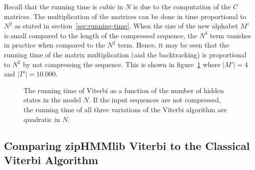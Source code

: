 Recall that the running time is cubic in $N$ is due to the computation of the
$C$ matrices. The multiplication of the matrices can be done in time
proportional to $N^2$ as stated in section~\ref{sec:running-time}. When the
size of the new alphabet $M'$ is small compared to the length of the compressed
sequence, the $N^3$ term vanishes in practice when compared to the $N^2$
term. Hence, it may be seen that the running time of the matrix multiplication
(and the backtracking) is proportional to $N^2$ by not compressing the
sequence. This is shown in figure~\ref{fig:assymptotic_viterbi_N} where
$\lvert M' \rvert = 4$ and $\lvert T' \rvert = 10.000$.

\begin{figure}
  \centering
  
  \caption{The running time of Viterbi as a function of the number of hidden
    states in the model $N$. If the input sequences are not compressed, the
    running time of all three variations of the Viterbi algorithm are quadratic
    in $N$.}
  \label{fig:assymptotic_viterbi_N}
\end{figure}


\subsection{Comparing zipHMMlib Viterbi to the Classical Viterbi Algorithm}
\label{sec:comp-ziphmml-viterbi}


